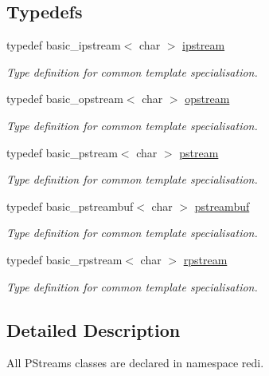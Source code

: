 \subsection*{Typedefs}
\begin{DoxyCompactItemize}
\item 
typedef basic\+\_\+ipstream$<$ char $>$ \mbox{\hyperlink{namespaceredi_ac615c484a62785daa22c528ed96045e6}{ipstream}}
\begin{DoxyCompactList}\small\item\em Type definition for common template specialisation. \end{DoxyCompactList}\item 
typedef basic\+\_\+opstream$<$ char $>$ \mbox{\hyperlink{namespaceredi_afdfd2eccec7c6badbbc1cd16d2ff60fd}{opstream}}
\begin{DoxyCompactList}\small\item\em Type definition for common template specialisation. \end{DoxyCompactList}\item 
typedef basic\+\_\+pstream$<$ char $>$ \mbox{\hyperlink{namespaceredi_a85c3ba20ca5244e214138372b3a61c35}{pstream}}
\begin{DoxyCompactList}\small\item\em Type definition for common template specialisation. \end{DoxyCompactList}\item 
typedef basic\+\_\+pstreambuf$<$ char $>$ \mbox{\hyperlink{namespaceredi_a4e3c818f3c5ee38281ff623f420fedb5}{pstreambuf}}
\begin{DoxyCompactList}\small\item\em Type definition for common template specialisation. \end{DoxyCompactList}\item 
typedef basic\+\_\+rpstream$<$ char $>$ \mbox{\hyperlink{namespaceredi_a253a3457ef520e874ec8dadc1443d4a5}{rpstream}}
\begin{DoxyCompactList}\small\item\em Type definition for common template specialisation. \end{DoxyCompactList}\end{DoxyCompactItemize}


\subsection{Detailed Description}
All P\+Streams classes are declared in namespace redi. 

